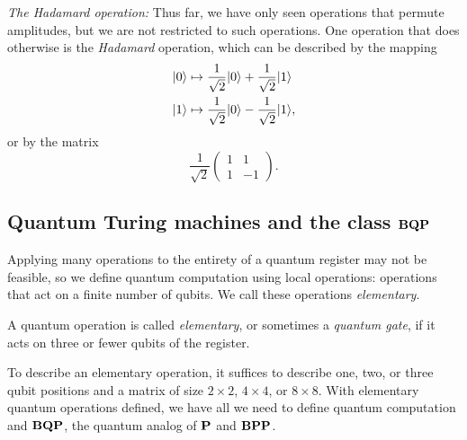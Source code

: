 \documentclass[12pt]{article}
\begin{document}
\begin{adjustwidth}{0.25in}{0in}
  \noindent \emph{The Hadamard operation:} Thus far, we have only seen
  operations that permute amplitudes, but we are not restricted to such
  operations. One operation that does otherwise is the \emph{Hadamard}
  operation, which can be described by the mapping
  \begin{align*}
    \qz &\mapsto \frac{1}{\sqrt{2}} \qz + \frac{1}{\sqrt{2}} \qo \\
    \qo &\mapsto \frac{1}{\sqrt{2}} \qz - \frac{1}{\sqrt{2}} \qo,
  \end{align*}
  or by the matrix
  $$
    \frac{1}{\sqrt{2}} \begin{pmatrix}
      1 & 1 \\
      1 & -1
    \end{pmatrix}.
  $$
\end{adjustwidth}

\subsection{Quantum Turing machines and the class $\mathbf{BQP}$}
Applying many operations to the entirety of a quantum register may not be
feasible, so we define quantum computation using local operations: operations
that act on a finite number of qubits. We call these operations
\emph{elementary}.
\begin{defn}
  A quantum operation is called \emph{elementary}, or sometimes a \emph{quantum
  gate}, if it acts on three or fewer qubits of the register.
\end{defn}
To describe an elementary operation, it suffices to describe one, two, or three
qubit positions and a matrix of size $2 \times 2$, $4 \times 4$, or $8 \times
8$. With elementary quantum operations defined, we have all we need to define
quantum computation and $\mathbf{BQP}$, the quantum analog of $\mathbf{P}$ and $\mathbf{BPP}$.
\end{document}
